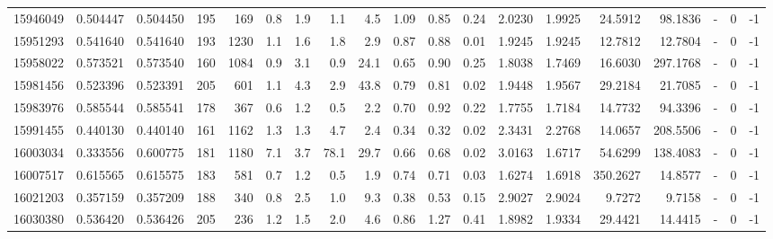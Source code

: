 \begin{tabular}{rrrrrrrrrrrrrrrrlrr}
  15946049 & 0.504447 &   0.504450 &  195 &  169 &      0.8 &      1.9 &     1.1 &      4.5 &       1.09 &        0.85 &        0.24 &  2.0230 &  1.9925 &   24.5912 &   98.1836 &             - &        0 &         -1 \\
  15951293 & 0.541640 &   0.541640 &  193 & 1230 &      1.1 &      1.6 &     1.8 &      2.9 &       0.87 &        0.88 &        0.01 &  1.9245 &  1.9245 &   12.7812 &   12.7804 &             - &        0 &         -1 \\
  15958022 & 0.573521 &   0.573540 &  160 & 1084 &      0.9 &      3.1 &     0.9 &     24.1 &       0.65 &        0.90 &        0.25 &  1.8038 &  1.7469 &   16.6030 &  297.1768 &             - &        0 &         -1 \\
  15981456 & 0.523396 &   0.523391 &  205 &  601 &      1.1 &      4.3 &     2.9 &     43.8 &       0.79 &        0.81 &        0.02 &  1.9448 &  1.9567 &   29.2184 &   21.7085 &             - &        0 &         -1 \\
  15983976 & 0.585544 &   0.585541 &  178 &  367 &      0.6 &      1.2 &     0.5 &      2.2 &       0.70 &        0.92 &        0.22 &  1.7755 &  1.7184 &   14.7732 &   94.3396 &             - &        0 &         -1 \\
  15991455 & 0.440130 &   0.440140 &  161 & 1162 &      1.3 &      1.3 &     4.7 &      2.4 &       0.34 &        0.32 &        0.02 &  2.3431 &  2.2768 &   14.0657 &  208.5506 &             - &        0 &         -1 \\
  16003034 & 0.333556 &   0.600775 &  181 & 1180 &      7.1 &      3.7 &    78.1 &     29.7 &       0.66 &        0.68 &        0.02 &  3.0163 &  1.6717 &   54.6299 &  138.4083 &             - &        0 &         -1 \\
  16007517 & 0.615565 &   0.615575 &  183 &  581 &      0.7 &      1.2 &     0.5 &      1.9 &       0.74 &        0.71 &        0.03 &  1.6274 &  1.6918 &  350.2627 &   14.8577 &             - &        0 &         -1 \\
  16021203 & 0.357159 &   0.357209 &  188 &  340 &      0.8 &      2.5 &     1.0 &      9.3 &       0.38 &        0.53 &        0.15 &  2.9027 &  2.9024 &    9.7272 &    9.7158 &             - &        0 &         -1 \\
  16030380 & 0.536420 &   0.536426 &  205 &  236 &      1.2 &      1.5 &     2.0 &      4.6 &       0.86 &        1.27 &        0.41 &  1.8982 &  1.9334 &   29.4421 &   14.4415 &             - &        0 &         -1 \\

\end{tabular}
